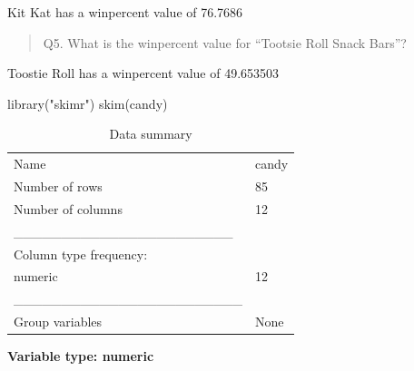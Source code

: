 \documentclass[
  letterpaper,
  DIV=11,
  numbers=noendperiod]{scrartcl}
\newenvironment{Shaded}{\begin{snugshade}}{\end{snugshade}}
\newcommand{\FunctionTok}[1]{\textcolor[rgb]{0.28,0.35,0.67}{#1}}
\newcommand{\NormalTok}[1]{\textcolor[rgb]{0.00,0.23,0.31}{#1}}
\newcommand{\StringTok}[1]{\textcolor[rgb]{0.13,0.47,0.30}{#1}}
\begin{document}
Kit Kat has a winpercent value of 76.7686

\begin{quote}
Q5. What is the winpercent value for ``Tootsie Roll Snack Bars''?
\end{quote}

Toostie Roll has a winpercent value of 49.653503

\begin{Shaded}
\begin{Highlighting}[]
\FunctionTok{library}\NormalTok{(}\StringTok{"skimr"}\NormalTok{)}
\FunctionTok{skim}\NormalTok{(candy)}
\end{Highlighting}
\end{Shaded}

\begin{longtable}[]{@{}ll@{}}
\caption{Data summary}\tabularnewline
\toprule\noalign{}
\endfirsthead
\endhead
\bottomrule\noalign{}
\endlastfoot
Name & candy \\
Number of rows & 85 \\
Number of columns & 12 \\
\_\_\_\_\_\_\_\_\_\_\_\_\_\_\_\_\_\_\_\_\_\_\_ & \\
Column type frequency: & \\
numeric & 12 \\
\_\_\_\_\_\_\_\_\_\_\_\_\_\_\_\_\_\_\_\_\_\_\_\_ & \\
Group variables & None \\
\end{longtable}

\textbf{Variable type: numeric}
\end{document}
